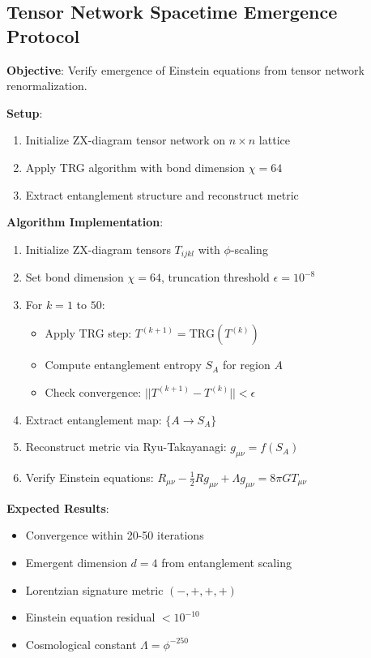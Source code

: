 \documentclass[11pt]{article}
\theoremstyle{definition}
\newcommand{\goldenratio}{\phi}
\begin{document}
\subsection{Tensor Network Spacetime Emergence Protocol}

\textbf{Objective}: Verify emergence of Einstein equations from tensor network renormalization.

\textbf{Setup}:
\begin{enumerate}
\item Initialize ZX-diagram tensor network on $n \times n$ lattice
\item Apply TRG algorithm with bond dimension $\chi = 64$
\item Extract entanglement structure and reconstruct metric
\end{enumerate}

\textbf{Algorithm Implementation}:
\begin{enumerate}
\item Initialize ZX-diagram tensors $T_{ijkl}$ with $\goldenratio$-scaling
\item Set bond dimension $\chi = 64$, truncation threshold $\epsilon = 10^{-8}$
\item For $k = 1$ to $50$:
\begin{itemize}
\item Apply TRG step: $T^{(k+1)} = \text{TRG}(T^{(k)})$
\item Compute entanglement entropy $S_A$ for region $A$
\item Check convergence: $||T^{(k+1)} - T^{(k)}|| < \epsilon$
\end{itemize}
\item Extract entanglement map: $\{A \to S_A\}$
\item Reconstruct metric via Ryu-Takayanagi: $g_{\mu\nu} = f(S_A)$
\item Verify Einstein equations: $R_{\mu\nu} - \frac{1}{2}Rg_{\mu\nu} + \Lambda g_{\mu\nu} = 8\pi G T_{\mu\nu}$
\end{enumerate}

\textbf{Expected Results}:
\begin{itemize}
\item Convergence within 20-50 iterations
\item Emergent dimension $d = 4$ from entanglement scaling
\item Lorentzian signature metric $(-,+,+,+)$
\item Einstein equation residual $< 10^{-10}$
\item Cosmological constant $\Lambda = \goldenratio^{-250}$
\end{itemize}
\end{document}
